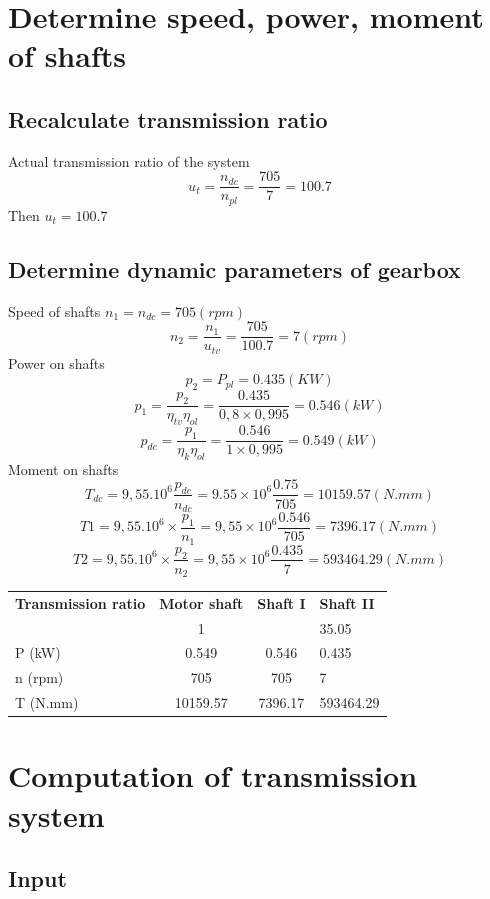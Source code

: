   
\section{Determine speed, power, moment of shafts}
\subsection{	Recalculate transmission ratio }
Actual transmission ratio of the system 
$$u_t=\frac{n_{dc}}{n_{pl}}=\frac{705}{7}=100.7$$
Then $u_t = 100.7$
\subsection{Determine dynamic parameters of gearbox }
Speed of shafts
$n_1=n_{dc}=705 (rpm)$
$$n_2=\frac{n_1}{u_{tv}}=\frac{705}{100.7}=7 (rpm)$$
Power on shafts 
$$p_2= P_{pl}= 0.435 (KW)$$
$$p_1=\frac{p_2}{\eta_{tv}\eta_{ol}}=\frac{0.435}{0,8\times0,995}=0.546 (kW) $$
$$p_{dc}=\frac{p_1}{\eta_k\eta_{ol}}=\frac{0.546}{1\times0,995}=0.549  (kW) $$
	Moment on shafts
$$T_{dc}=9,55.10^6\frac{p_{dc}}{n_{dc}}=9.55\times10^6\frac{0.75}{705}=10159.57  (N.mm) $$
$$ T1=9,55.10^6\times\frac{p_1}{n_1}=9,55\times10^6\frac{0.546}{705}=7396.17 (N.mm) $$
$$ T2=9,55.10^6\times\frac{p_2}{n_2}=9,55\times10^6\frac{0.435}{7}=593464.29  (N.mm) $$      

\begin{table}[h!]
  \begin{center}
    \label{tab:table1}
     \begin{tabular}{l|S|S|l}
      \textbf{Transmission ratio} & \textbf{Motor shaft} & \textbf{Shaft I } & \textbf{Shaft II}\\ %
      
       & 1 &  & 35.05 \\ %
      \hline
      P (kW) & 0.549 & 0.546 & 0.435\\ %
      n (rpm) & 705 & 705 & 7\\ %
      T (N.mm) & 10159.57   & 7396.17 & 593464.29  \\ %
    \end{tabular}
  \end{center}
\end{table}


\section {Computation of transmission system}
\subsection{Input}
	
